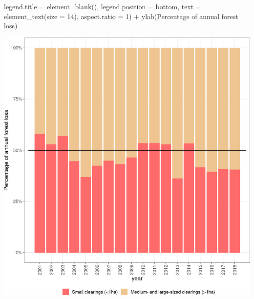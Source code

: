 \documentclass[10pt,landscape,a3paper]{article}
\newenvironment{Shaded}{\begin{snugshade}}{\end{snugshade}}
\newcommand{\AttributeTok}[1]{\textcolor[rgb]{0.77,0.63,0.00}{#1}}
\newcommand{\DecValTok}[1]{\textcolor[rgb]{0.00,0.00,0.81}{#1}}
\newcommand{\FunctionTok}[1]{\textcolor[rgb]{0.00,0.00,0.00}{#1}}
\newcommand{\NormalTok}[1]{#1}
\newcommand{\SpecialCharTok}[1]{\textcolor[rgb]{0.00,0.00,0.00}{#1}}
\newcommand{\StringTok}[1]{\textcolor[rgb]{0.31,0.60,0.02}{#1}}
\begin{document}
\begin{Shaded}
\begin{Highlighting}[]
        \AttributeTok{legend.title =} \FunctionTok{element\_blank}\NormalTok{(), }\AttributeTok{legend.position =} \StringTok{\textquotesingle{}bottom\textquotesingle{}}\NormalTok{,}
        \AttributeTok{text =} \FunctionTok{element\_text}\NormalTok{(}\AttributeTok{size =} \DecValTok{14}\NormalTok{), }\AttributeTok{aspect.ratio =} \DecValTok{1}\NormalTok{) }\SpecialCharTok{+}
  \FunctionTok{ylab}\NormalTok{(}\StringTok{\textquotesingle{}Percentage of annual forest loss\textquotesingle{}}\NormalTok{)}
\end{Highlighting}
\end{Shaded}

\begin{center}\includegraphics{img/modelling/aa-eda-ts-1} \end{center}
\end{document}

